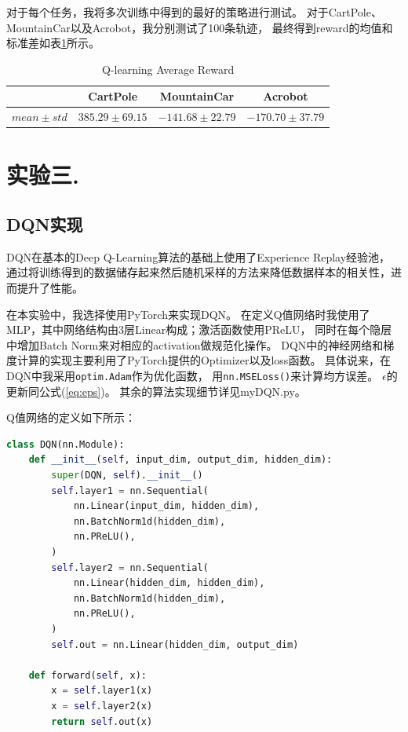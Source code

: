 \documentclass[a4paper,UTF8]{article}
\theoremstyle{definition}
\begin{document}
对于每个任务，我将多次训练中得到的最好的策略进行测试。
对于CartPole、MountainCar以及Acrobot，我分别测试了100条轨迹，
最终得到reward的均值和标准差如表\ref{tab:reward-ql}所示。

\begin{table}[H]
	\centering
	\caption{Q-learning Average Reward}\label{tab:reward-ql}
	\begin{tabular}{c|ccc}
		\toprule
		& CartPole & MountainCar & Acrobot \\
		\midrule
		$mean \pm std$ &
		$385.29 \pm 69.15$ &
		$-141.68 \pm 22.79$ &
		$-170.70 \pm 37.79$ \\
		\bottomrule
	\end{tabular}
\end{table}

\section*{实验三.}

\subsection*{DQN实现}

DQN在基本的Deep Q-Learning算法的基础上使用了Experience Replay经验池，
通过将训练得到的数据储存起来然后随机采样的方法来降低数据样本的相关性，进而提升了性能。

在本实验中，我选择使用PyTorch来实现DQN。
在定义Q值网络时我使用了MLP，其中网络结构由3层Linear构成；激活函数使用PReLU，
同时在每个隐层中增加Batch Norm来对相应的activation做规范化操作。
DQN中的神经网络和梯度计算的实现主要利用了PyTorch提供的Optimizer以及loss函数。
具体说来，在DQN中我采用\lstinline[language=Python]{optim.Adam}作为优化函数，
用\lstinline[language=Python]{nn.MSELoss()}来计算均方误差。
$\epsilon$的更新同公式(\ref{eq:eps})。
其余的算法实现细节详见myDQN.py。

Q值网络的定义如下所示：

\begin{lstlisting}[language=Python]
class DQN(nn.Module):
    def __init__(self, input_dim, output_dim, hidden_dim):
        super(DQN, self).__init__()
        self.layer1 = nn.Sequential(
            nn.Linear(input_dim, hidden_dim),
            nn.BatchNorm1d(hidden_dim),
            nn.PReLU(),
        )
        self.layer2 = nn.Sequential(
            nn.Linear(hidden_dim, hidden_dim),
            nn.BatchNorm1d(hidden_dim),
            nn.PReLU(),
        )
        self.out = nn.Linear(hidden_dim, output_dim)

    def forward(self, x):
        x = self.layer1(x)
        x = self.layer2(x)
        return self.out(x)
\end{lstlisting}
\end{document}
